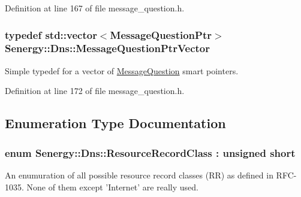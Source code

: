 Definition at line 167 of file message\-\_\-question.\-h.

\hypertarget{namespace_senergy_1_1_dns_a76982150ca0b86c08d888f3e3e805747}{
\subsubsection[{Message\-Question\-Ptr\-Vector}]{\setlength{\rightskip}{0pt plus 5cm}typedef std\-::vector$<${\bf Message\-Question\-Ptr}$>$ {\bf Senergy\-::\-Dns\-::\-Message\-Question\-Ptr\-Vector}}}\label{namespace_senergy_1_1_dns_a76982150ca0b86c08d888f3e3e805747}


Simple typedef for a vector of \hyperlink{class_senergy_1_1_dns_1_1_message_question}{Message\-Question} smart pointers. 



Definition at line 172 of file message\-\_\-question.\-h.



\subsection{Enumeration Type Documentation}
\hypertarget{namespace_senergy_1_1_dns_a953f153bc411213d621d00c1e1b3eb9d}{
\subsubsection[{Resource\-Record\-Class}]{\setlength{\rightskip}{0pt plus 5cm}enum {\bf Senergy\-::\-Dns\-::\-Resource\-Record\-Class} \-: unsigned short\hspace{0.3cm}{\ttfamily [strong]}}}\label{namespace_senergy_1_1_dns_a953f153bc411213d621d00c1e1b3eb9d}


An enumuration of all possible resource record classes (R\-R) as defined in R\-F\-C-\/1035. None of them except 'Internet' are really used. 

